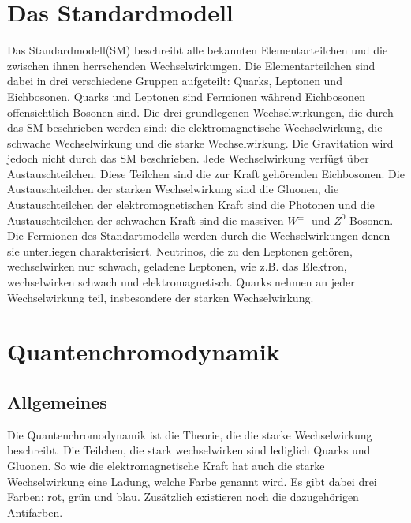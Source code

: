 \section{Das Standardmodell}
Das Standardmodell(SM) beschreibt alle bekannten Elementarteilchen und die zwischen ihnen herrschenden Wechselwirkungen. Die Elementarteilchen sind dabei in drei verschiedene Gruppen aufgeteilt: Quarks, Leptonen und Eichbosonen. Quarks und Leptonen sind Fermionen während Eichbosonen offensichtlich Bosonen sind. Die drei grundlegenen Wechselwirkungen, die durch das SM beschrieben werden sind: die elektromagnetische Wechselwirkung, die schwache Wechselwirkung und die starke Wechselwirkung. Die Gravitation wird jedoch nicht durch das SM beschrieben.
Jede Wechselwirkung verfügt über Austauschteilchen. Diese Teilchen sind die zur Kraft gehörenden Eichbosonen. Die Austauschteilchen der starken Wechselwirkung sind die Gluonen, die Austauschteilchen der elektromagnetischen Kraft sind die Photonen und die Austauschteilchen der schwachen Kraft sind die massiven $W^{\pm}$- und $Z^{0}$-Bosonen.
Die Fermionen des Standartmodells werden durch die Wechselwirkungen denen sie unterliegen charakterisiert. Neutrinos, die zu den Leptonen gehören, wechselwirken nur schwach, geladene Leptonen, wie z.B. das Elektron, wechselwirken schwach und elektromagnetisch. Quarks nehmen an jeder Wechselwirkung teil, insbesondere der starken Wechselwirkung.

\section{Quantenchromodynamik}
\subsection{Allgemeines}
Die Quantenchromodynamik ist die Theorie, die die starke Wechselwirkung beschreibt. Die Teilchen, die stark wechselwirken sind lediglich Quarks und Gluonen. So wie die elektromagnetische Kraft hat auch die starke Wechselwirkung eine Ladung, welche Farbe genannt wird. Es gibt dabei drei Farben: rot, grün und blau. Zusätzlich existieren noch die dazugehörigen Antifarben. 
